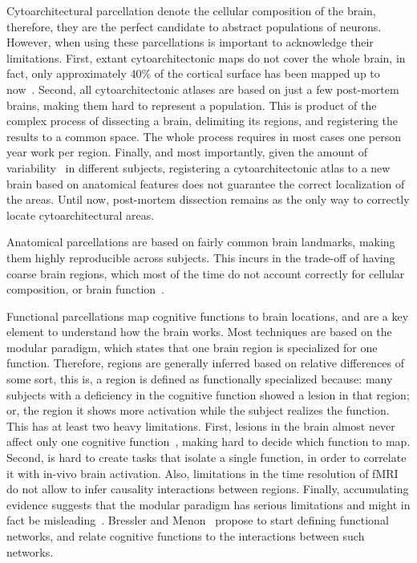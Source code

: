 Cytoarchitectural parcellation denote the cellular composition of the brain,
therefore, they are the perfect candidate to abstract populations of neurons.
However, when using these parcellations is important to acknowledge their limitations.
First, extant cytoarchitectonic maps do not cover the whole brain, in fact, only 
approximately 40\% of the cortical surface has been mapped up to
now~\cite{Amunts2007}. Second, all cytoarchitectonic atlases are based on just
a few post-mortem brains, making them hard to represent a population. This is
product of the complex process of dissecting a brain, delimiting its regions,
and registering the results to a common space. The whole process requires in most
cases one person year work per region. Finally, and most importantly, given the
amount of variability~\cite{Zilles2013} in different subjects, registering a 
cytoarchitectonic atlas to a new brain based on anatomical features does not
guarantee the correct localization of the areas. Until now, post-mortem dissection
remains as the only way to correctly locate cytoarchitectural areas.

Anatomical parcellations are based on fairly common brain landmarks, making them
highly reproducible across subjects. This incurs in the trade-off of having coarse
brain regions, which most of the time do not account correctly for cellular
composition, or brain function~\cite{Amunts2007}.

Functional parcellations map cognitive functions to brain locations, and are
a key element to understand how the brain works. Most techniques are based
on the modular paradigm, which states that one brain region is specialized
for one function. Therefore, regions are generally inferred based on relative
differences of some sort, this is, a region is defined as functionally specialized
because: many subjects with a deficiency in the cognitive function showed a
lesion in that region; or, the region it shows more activation while the subject
realizes the function. This has at least two heavy limitations. First, lesions
in the brain almost never affect only one cognitive function~\cite{Fuster2000},
making hard to decide which function to map. Second, is hard to create tasks
that isolate a single function, in order to correlate it with in-vivo brain
activation. Also, limitations in the time resolution of fMRI do not allow to
infer causality interactions between regions. Finally, accumulating evidence
suggests that the modular paradigm has serious limitations and might in fact
be misleading~\cite{Bressler2010}. Bressler and Menon~\cite{Bressler2010}
propose to start defining functional networks, and relate cognitive functions
to the interactions between such networks.

